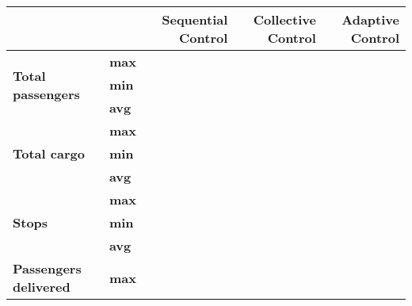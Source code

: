 \begin{table}[]
\centering
\begin{tabular}{llrrr}
                                      &     & \begin{minipage}{2cm}\textbf{Sequential Control} \vspace{1em}\end{minipage} & \begin{minipage}{2cm}\textbf{Collective Control} \vspace{1em}\end{minipage} & \begin{minipage}{2cm}\textbf{Adaptive Control} \vspace{1em}\end{minipage}\\
\hline
\multirow{3}{*}{\textbf{Total passengers}}     & \textbf{max} &                   &                    &                  \\
                                               & \textbf{min} &                   &                    &                  \\
                                               & \textbf{avg} &                   &                    &                  \\
\hline                                               
\multirow{3}{*}{\textbf{Total cargo}}          & \textbf{max} &                   &                    &                  \\
                                               & \textbf{min} &                   &                    &                  \\
                                               & \textbf{avg} &                   &                    &                  \\
\hline                                               
\multirow{3}{*}{\textbf{Stops}}                & \textbf{max} &                   &                    &                  \\
                                               & \textbf{min} &                   &                    &                  \\
                                               & \textbf{avg} &                   &                    &                  \\
\hline                                               
\multirow{3}{*}{\textbf{Passengers delivered}} & \textbf{max} &                   &                    &                  \\

\end{tabular}
\end{table}
